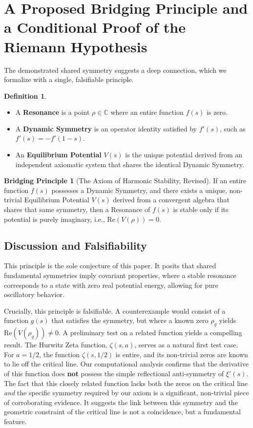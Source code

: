\documentclass{article}
\theoremstyle{plain}
\theoremstyle{definition}
\newtheorem{definition}[theorem]{Definition}
\newtheorem{conjecture}[theorem]{Bridging Principle}
\theoremstyle{remark}
\begin{document}
\section{A Proposed Bridging Principle and a Conditional Proof of the Riemann Hypothesis}
The demonstrated shared symmetry suggests a deep connection, which we formalize with a single, falsifiable principle.

\begin{definition}
\begin{itemize}
    \item A \textbf{Resonance} is a point $\rho \in \mathbb{C}$ where an entire function $f(s)$ is zero.
    \item A \textbf{Dynamic Symmetry} is an operator identity satisfied by $f'(s)$, such as $f'(s) = -f'(1-s)$.
    \item An \textbf{Equilibrium Potential} $V(s)$ is the unique potential derived from an independent axiomatic system that shares the identical Dynamic Symmetry.
\end{itemize}
\end{definition}

\begin{conjecture}[The Axiom of Harmonic Stability, Revised]
\label{conj:stability}
If an entire function $f(s)$ possesses a Dynamic Symmetry, and there exists a unique, non-trivial Equilibrium Potential $V(s)$ derived from a convergent algebra that shares that same symmetry, then a Resonance of $f(s)$ is stable only if its potential is purely imaginary, i.e., $\mathrm{Re}(V(\rho))=0$.
\end{conjecture}

\subsection{Discussion and Falsifiability}
This principle is the sole conjecture of this paper. It posits that shared fundamental symmetries imply covariant properties, where a stable resonance corresponds to a state with zero real potential energy, allowing for pure oscillatory behavior.

Crucially, this principle is falsifiable. A counterexample would consist of a function $g(s)$ that satisfies the symmetry, but where a known zero $\rho_g$ yields $\text{Re}(V(\rho_g)) \neq 0$. A preliminary test on a related function yields a compelling result. The Hurwitz Zeta function, $\zeta(s, a)$, serves as a natural first test case. For $a=1/2$, the function $\zeta(s, 1/2)$ is entire, and its non-trivial zeros are known to lie off the critical line. Our computational analysis confirms that the derivative of this function does \textbf{not} possess the simple reflectional anti-symmetry of $\xi'(s)$. The fact that this closely related function lacks both the zeros on the critical line \textit{and} the specific symmetry required by our axiom is a significant, non-trivial piece of corroborating evidence. It suggests the link between this symmetry and the geometric constraint of the critical line is not a coincidence, but a fundamental feature.
\end{document}
